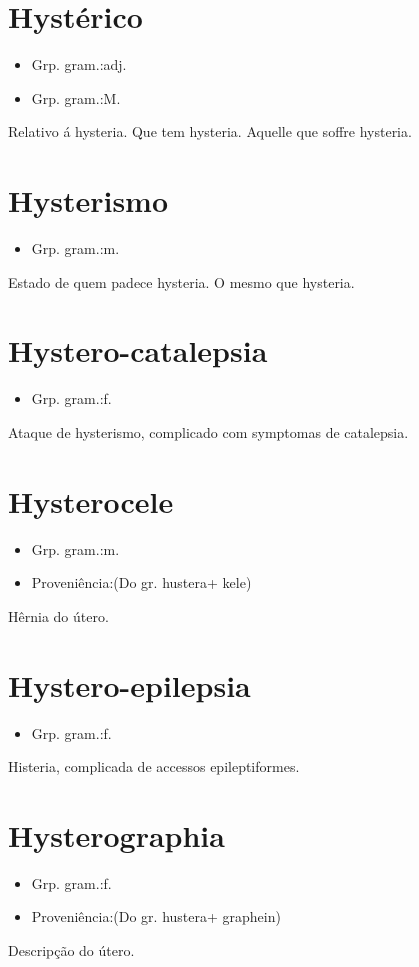 \documentclass{article}
\begin{document}
\section{Hystérico}
\begin{itemize}
\item {Grp. gram.:adj.}
\end{itemize}
\begin{itemize}
\item {Grp. gram.:M.}
\end{itemize}
Relativo á hysteria.
Que tem hysteria.
Aquelle que soffre hysteria.
\section{Hysterismo}
\begin{itemize}
\item {Grp. gram.:m.}
\end{itemize}
Estado de quem padece hysteria.
O mesmo que \textunderscore hysteria\textunderscore .
\section{Hystero-catalepsia}
\begin{itemize}
\item {Grp. gram.:f.}
\end{itemize}
Ataque de hysterismo, complicado com symptomas de catalepsia.
\section{Hysterocele}
\begin{itemize}
\item {Grp. gram.:m.}
\end{itemize}
\begin{itemize}
\item {Proveniência:(Do gr. \textunderscore hustera\textunderscore  + \textunderscore kele\textunderscore )}
\end{itemize}
Hêrnia do útero.
\section{Hystero-epilepsia}
\begin{itemize}
\item {Grp. gram.:f.}
\end{itemize}
Histeria, complicada de accessos epileptiformes.
\section{Hysterographia}
\begin{itemize}
\item {Grp. gram.:f.}
\end{itemize}
\begin{itemize}
\item {Proveniência:(Do gr. \textunderscore hustera\textunderscore  + \textunderscore graphein\textunderscore )}
\end{itemize}
Descripção do útero.
\end{document}
